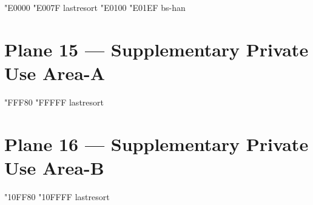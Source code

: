 \documentclass{article}
\begin{document}
                                               { "E0000} { "E007F} {lastresort}
                     { "E0100} { "E01EF} {bs-han}

\section{Plane 15 --- Supplementary Private Use Area-A}

                   { "FFF80} { "FFFFF} {lastresort}

\section{Plane 16 --- Supplementary Private Use Area-B}

                   {"10FF80} {"10FFFF} {lastresort}
\end{document}
